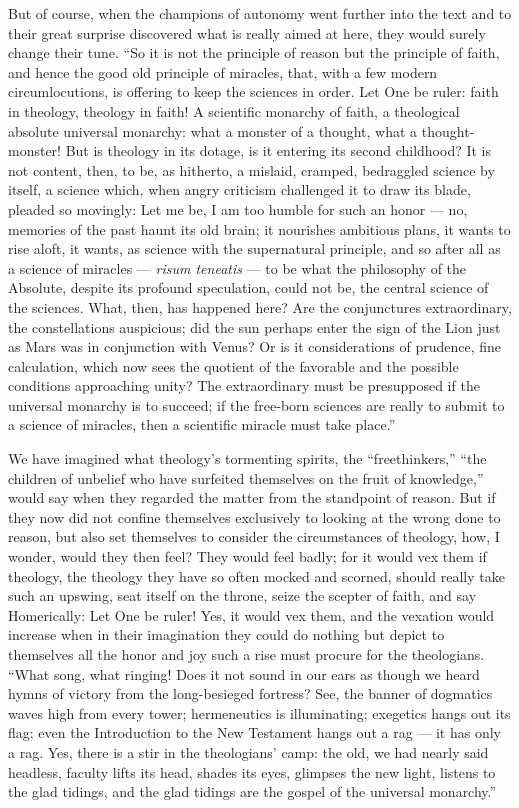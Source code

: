 \documentclass[12pt]{book}
\newcommand{\opage}[1]{\marginnote{\footnotesize\textit{[#1]}}}
\begin{document}
But of course, when the champions of autonomy went further into the text and to their great surprise discovered what is really aimed at here, they would surely change their tune. ``So it is not the principle of reason but the principle of faith, and hence the good old principle of miracles, that, with a few modern circumlocutions, is offering to keep the sciences in order. Let One be ruler: faith in theology, theology in faith! A scientific monarchy of faith, a theological absolute universal monarchy: what a monster of a thought, what a thought-monster! But is theology in its dotage, is it entering its second childhood? It is not content, then, to be, as hitherto, a mislaid, cramped, bedraggled science by itself, a science which, when angry criticism challenged it to draw its blade, pleaded so movingly: Let me be, I am too humble for such an honor --- no, memories of the past haunt its old brain; it nourishes ambitious plans, it wants to rise aloft, it wants, as science with the supernatural principle, and so after all as a science of miracles --- \textit{risum teneatis} --- to be what the philosophy of the Absolute, despite its profound speculation, could not be, the central science
\opage{3}\setcounter{footnote}{0}%
of the sciences. What, then, has happened here? Are the conjunctures extraordinary, the constellations auspicious; did the sun perhaps enter the sign of the Lion just as Mars was in conjunction with Venus? Or is it considerations of prudence, fine calculation, which now sees the quotient of the favorable and the possible conditions approaching unity? The extraordinary must be presupposed if the universal monarchy is to succeed; if the free-born sciences are really to submit to a science of miracles, then a scientific miracle must take place.''

We have imagined what theology's tormenting spirits, the ``freethinkers,'' ``the children of unbelief who have surfeited themselves on the fruit of knowledge,'' would say when they regarded the matter from the standpoint of reason. But if they now did not confine themselves exclusively to looking at the wrong done to reason, but also set themselves to consider the circumstances of theology, how, I wonder, would they then feel? They would feel badly; for it would vex them if theology, the theology they have so often mocked and scorned, should really take such an upswing, seat itself on the throne, seize the scepter of faith, and say Homerically: Let One be ruler! Yes, it would vex them, and the vexation would increase when in their imagination they could do nothing but depict to themselves all the honor and joy such a rise must procure for the theologians. ``What song, what ringing! Does it not sound in our ears as though we heard hymns of victory from the long-besieged fortress? See, the banner of dogmatics waves high from every tower; hermeneutics is illuminating; exegetics hangs out its flag; even the Introduction to the New Testament hangs out a rag --- it has only a rag. Yes, there is a stir in the theologians' camp: the old, we had nearly said headless, faculty lifts its head, shades its eyes, glimpses the new light, listens to the glad tidings, and the glad tidings are the gospel of the universal monarchy.''
\end{document}
